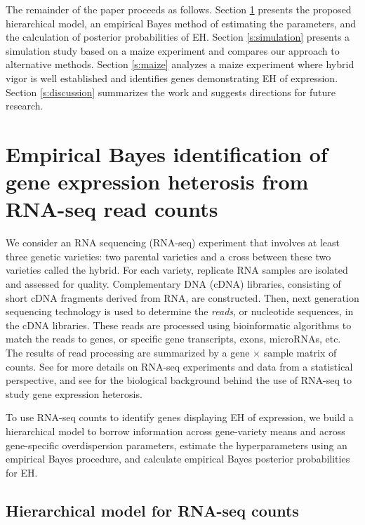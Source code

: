 \documentclass[useAMS,usenatbib,referee]{biom}
\newcommand{\RNAseq}{RNA-seq}
\begin{document}
The remainder of the paper proceeds as follows. Section \ref{s:method} presents the proposed hierarchical model, an empirical Bayes method of estimating the parameters, and the calculation of posterior probabilities of EH. Section \ref{s:simulation} presents a simulation study based on a maize experiment and compares our approach to alternative methods. Section \ref{s:maize} analyzes a maize experiment where hybrid vigor is well established and identifies genes demonstrating EH of expression. Section \ref{s:discussion} summarizes the work and suggests directions for future research.


\section{Empirical Bayes identification of gene expression heterosis from \RNAseq{} read counts}
\label{s:method}

We consider an RNA sequencing (\RNAseq{}) experiment that involves at least three genetic varieties: two parental varieties and a cross between these two varieties called the hybrid. For each variety, replicate RNA samples are isolated and assessed for quality. Complementary DNA (cDNA) libraries, consisting of short cDNA fragments derived from RNA, are constructed. Then, next generation sequencing technology is used to determine the \emph{reads}, or nucleotide sequences, in the cDNA libraries. These reads are processed using bioinformatic algorithms to match the reads to genes, or specific gene transcripts, exons, microRNAs, etc. The results of read processing are summarized by a gene $\times$ sample matrix of counts. See \cite{datta2014statistical} for more details on \RNAseq{} experiments and data from a statistical perspective, and see \cite{paschold2012complementation} for the biological background behind the use of \RNAseq{} to study gene expression heterosis.

To use \RNAseq{} counts to identify genes displaying EH of expression, we build a hierarchical model to borrow information across gene-variety means and across gene-specific overdispersion parameters, estimate the hyperparameters using an empirical Bayes procedure, and calculate empirical Bayes posterior probabilities for EH. 


\subsection{Hierarchical model for \RNAseq{} counts}
\label{s:model}
\end{document}
